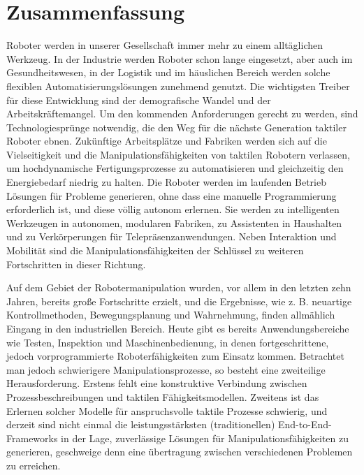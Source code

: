 \chapter*{Zusammenfassung}

Roboter werden in unserer Gesellschaft immer mehr zu einem allt\"aglichen Werkzeug.
In der Industrie werden Roboter schon lange eingesetzt, aber auch im Gesundheitswesen, in der Logistik und im h\"auslichen Bereich werden solche flexiblen Automatisierungsl\"osungen zunehmend genutzt.
Die wichtigsten Treiber f\"ur diese Entwicklung sind der demografische Wandel und der Arbeitskr\"aftemangel.
Um den kommenden Anforderungen gerecht zu werden, sind Technologiespr\"unge notwendig, die den Weg f\"ur die n\"achste Generation taktiler Roboter ebnen.
Zuk\"unftige Arbeitspl\"atze und Fabriken werden sich auf die Vielseitigkeit und die Manipulationsf\"ahigkeiten von taktilen Robotern verlassen, um hochdynamische Fertigungsprozesse zu automatisieren und gleichzeitig den Energiebedarf niedrig zu halten.
Die Roboter werden im laufenden Betrieb L\"osungen f\"ur Probleme generieren, ohne dass eine manuelle Programmierung erforderlich ist, und diese v\"ollig autonom erlernen.
Sie werden zu intelligenten Werkzeugen in autonomen, modularen Fabriken, zu Assistenten in Haushalten und zu Verk\"orperungen f\"ur Telepr\"asenzanwendungen.
Neben Interaktion und Mobilit\"at sind die Manipulationsf\"ahigkeiten der Schl\"ussel zu weiteren Fortschritten in dieser Richtung.

Auf dem Gebiet der Robotermanipulation wurden, vor allem in den letzten zehn Jahren, bereits gro{\ss}e Fortschritte erzielt, und die Ergebnisse, wie z. B. neuartige Kontrollmethoden, Bewegungsplanung und Wahrnehmung, finden allm\"ahlich Eingang in den industriellen Bereich.
Heute gibt es bereits Anwendungsbereiche wie Testen, Inspektion und Maschinenbedienung, in denen fortgeschrittene, jedoch vorprogrammierte Roboterf\"ahigkeiten zum Einsatz kommen.
Betrachtet man jedoch schwierigere Manipulationsprozesse, so besteht eine zweiteilige Herausforderung. Erstens fehlt eine konstruktive Verbindung zwischen Prozessbeschreibungen und taktilen F\"ahigkeitsmodellen. Zweitens ist das Erlernen solcher Modelle f\"ur anspruchsvolle taktile Prozesse schwierig, und derzeit sind nicht einmal die leistungsst\"arksten (traditionellen) End-to-End-Frameworks in der Lage, zuverl\"assige L\"osungen f\"ur Manipulationsf\"ahigkeiten zu generieren, geschweige denn eine \"ubertragung zwischen verschiedenen Problemen zu erreichen.


